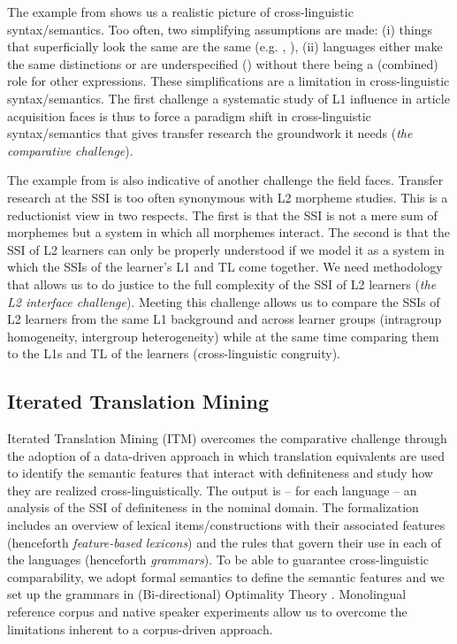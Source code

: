 \documentclass[output=paper,
modfonts
]{langscibook}
\begin{document}
The example from \citet{SnapeLeungTing2006} shows us a realistic picture of cross-linguistic syntax/semantics. Too often, two simplifying assumptions are made: (i) things that superficially look the same are the same (e.g. , ), (ii) languages either make the same distinctions or are underspecified () without there being a (combined) role for other expressions. These simplifications are a limitation in cross-linguistic syntax/semantics. The first challenge a systematic study of L1 influence in article acquisition faces is thus to force a paradigm shift in cross-linguistic syntax/semantics that gives transfer research the groundwork it needs (\textit{the comparative challenge}).

The example from \citet{SnapeLeungTing2006} is also indicative of another challenge the field faces. Transfer research at the SSI is too often synonymous with L2 morpheme studies. This is a reductionist view in two respects. The first is that the SSI is not a mere sum of morphemes but a system in which all morphemes interact. The second is that the SSI of L2 learners can only be properly understood if we model it as a system in which the SSIs of the learner’s L1 and TL come together. We need methodology that allows us to do justice to the full complexity of the SSI of L2 learners (\textit{the L2 interface challenge}). Meeting this challenge allows us to compare the SSIs of L2 learners from the same L1 background and across learner groups (intragroup homogeneity, intergroup heterogeneity) while at the same time comparing them to the L1s and TL of the learners (cross-linguistic congruity).

\subsection{Iterated Translation Mining}

Iterated Translation Mining (ITM) overcomes the comparative challenge through the adoption of a data-driven approach in which translation equivalents are used to identify the semantic features that interact with definiteness and study how they are realized cross-linguistically. The output is -- for each language -- an analysis of the SSI of definiteness in the nominal domain. The formalization includes an overview of lexical items/constructions with their associated features (henceforth \textit{feature-based lexicons}) and the rules that govern their use in each of the languages (henceforth \textit{grammars}). To be able to guarantee cross-linguistic comparability, we adopt formal semantics to define the semantic features and we set up the grammars in (Bi-directional) Optimality Theory \citep{PrinceSmolensky2004,Hendriksetal2010}. Monolingual reference corpus and native speaker experiments allow us to overcome the limitations inherent to a corpus-driven approach.
\end{document}
